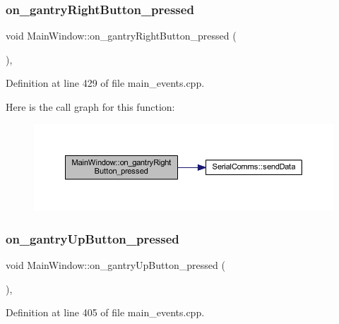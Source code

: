\subsubsection{\texorpdfstring{on\_gantryRightButton\_pressed}{on\_gantryRightButton\_pressed}}
{\footnotesize\ttfamily void Main\+Window\+::on\+\_\+gantry\+Right\+Button\+\_\+pressed (\begin{DoxyParamCaption}{ }\end{DoxyParamCaption})\hspace{0.3cm}{\ttfamily [private]}, {\ttfamily [slot]}}



Definition at line 429 of file main\+\_\+events.\+cpp.

Here is the call graph for this function\+:
\nopagebreak
\begin{figure}[H]
\begin{center}
\leavevmode
\includegraphics[width=350pt]{classMainWindow_a2456f40cbc5747391f01b61c59edd6dd_cgraph}
\end{center}
\end{figure}
\mbox{\label{classMainWindow_a6977641f537b731bb9ede0c341388fb1}} 
\subsubsection{\texorpdfstring{on\_gantryUpButton\_pressed}{on\_gantryUpButton\_pressed}}
{\footnotesize\ttfamily void Main\+Window\+::on\+\_\+gantry\+Up\+Button\+\_\+pressed (\begin{DoxyParamCaption}{ }\end{DoxyParamCaption})\hspace{0.3cm}{\ttfamily [private]}, {\ttfamily [slot]}}



Definition at line 405 of file main\+\_\+events.\+cpp.

